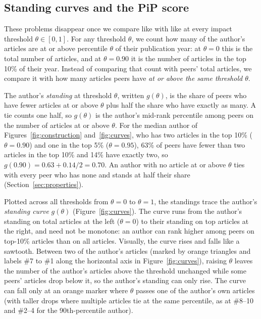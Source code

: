 \documentclass[11pt]{article}
\begin{document}
\subsection{Standing curves and the PiP score}
\label{sec:definition}
These problems disappear once we compare like with like at every impact threshold $\theta \in [0, 1]$. For any threshold
$\theta$, we count how many of the author's articles are at or above percentile $\theta$ of their publication year: at
$\theta = 0$ this is the total number of articles, and at $\theta = 0.90$ it is the number of articles in the top 10\%
of their year. Instead of comparing that count with peers' total articles, we compare it with how many articles peers
have \emph{at or above the same threshold $\theta$}.

The author's \emph{standing} at threshold $\theta$, written $g(\theta)$, is the share of peers who have fewer articles
at or above $\theta$ plus half the share who have exactly as many. A tie counts one half, so $g(\theta)$ is the author's
mid-rank percentile \citep{hazen1914storage} among peers on the number of articles at or above $\theta$. For the median
author of Figures~\ref{fig:construction} and~\ref{fig:curves}, who has two articles in the top 10\% ($\theta = 0.90$)
and one in the top 5\% ($\theta = 0.95$), 63\% of peers have fewer than two articles in the top 10\% and 14\% have
exactly two, so $g(0.90) = 0.63 + 0.14/2 = 0.70$. An author with no article at or above $\theta$ ties with every peer
who has none and stands at half their share (Section~\ref{sec:properties}).

Plotted across all thresholds from $\theta = 0$ to $\theta = 1$, the standings trace the author's \emph{standing curve}
$g(\theta)$ (Figure~\ref{fig:curves}). The curve runs from the author's standing on total articles at the left
($\theta = 0$) to their standing on top articles at the right, and need not be monotone: an author can rank higher among
peers on top-10\% articles than on all articles. Visually, the curve rises and falls like a sawtooth. Between two of
the author's articles (marked by orange triangles and labels \#7 to \#1 along the horizontal axis in
Figure~\ref{fig:curves}), raising $\theta$ leaves the number of the author's articles above the threshold unchanged
while some peers' articles drop below it, so the author's standing can only rise. The curve can fall only at an orange
marker where $\theta$ passes one of the author's own articles (with taller drops where multiple articles tie at the same
percentile, as at \#8--10 and \#2--4 for the 90th-percentile author).
\end{document}
